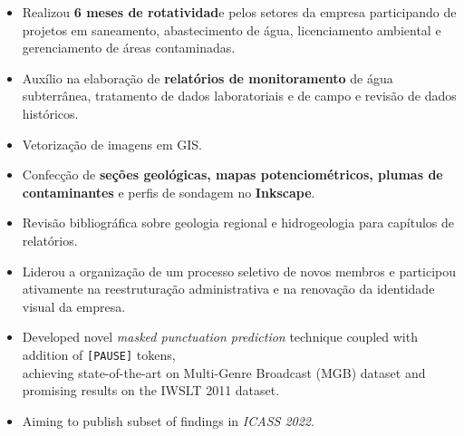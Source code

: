 \documentclass[10pt,a4paper,ragged2e,academicons]{altacv}
\begin{document}
\begin{itemize}
    \item Realizou \textbf{6 meses de rotatividad}e pelos setores da empresa participando de projetos em saneamento, abastecimento de água, licenciamento ambiental e gerenciamento de áreas contaminadas.
    \item Auxílio na elaboração de \textbf{relatórios de monitoramento} de água subterrânea, tratamento de dados laboratoriais e de campo e revisão de dados históricos. 
    \item Vetorização de imagens em GIS.
    \item Confecção de \textbf{seções geológicas, mapas potenciométricos, plumas de contaminantes} e perfis de sondagem no \textbf{Inkscape}.
    \item Revisão bibliográfica sobre geologia regional e hidrogeologia para capítulos de relatórios.
\end{itemize}
\divider

\begin{fullwidth}

\begin{itemize}
    \item Liderou a organização de um processo seletivo de novos membros e participou ativamente na reestruturação administrativa e na renovação da identidade visual da empresa.
    
\end{itemize}



\begin{itemize}
    \item Developed novel \emph{masked punctuation prediction} technique coupled with addition of \texttt{[PAUSE]} tokens,\\achieving state-of-the-art on Multi-Genre Broadcast (MGB) dataset and promising results on the IWSLT 2011 dataset.
    \item Aiming to publish subset of findings in \emph{ICASS 2022}.
\end{itemize}


\end{fullwidth}

% 
% 
% 
% 
% 
% 
% 
\end{document}
